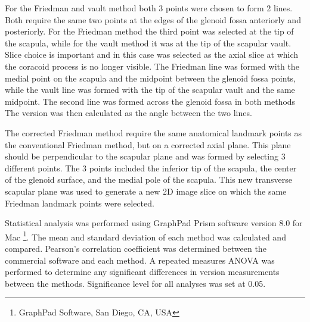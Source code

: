 For the Friedman and vault method both 3 points were chosen to form 2 lines. Both require the same two points at the edges of the glenoid fossa anteriorly and posteriorly. For the Friedman method the third point was selected at the tip of the scapula, while for the vault method it was at the tip of the scapular vault. Slice choice is important and in this case was selected as the axial slice at which the coracoid process is no longer visible. The Friedman line was formed with the medial point on the scapula and the midpoint between the glenoid fossa points, while the vault line was formed with the tip of the scapular vault and the same midpoint. The second line was formed across the glenoid fossa in both methods The version was then calculated as the angle between the two lines.

The corrected Friedman method require the same anatomical landmark points as the conventional Friedman method, but on a corrected axial plane. This plane should be perpendicular to the scapular plane and was formed by selecting 3 different points. The 3 points included the inferior tip of the scapula, the center of the glenoid surface, and the medial pole of the scapula. This new transverse scapular plane was used to generate a new 2D image slice on which the same Friedman landmark points were selected.


Statistical analysis was performed using GraphPad Prism software version 8.0 for
Mac \footnote{GraphPad Software, San Diego, CA, USA}. The mean and standard deviation of 
each method was calculated and compared. Pearson’s correlation coefficient was 
determined between the commercial software and each method. 
A repeated measures ANOVA was performed to determine any significant differences
in version measurements between the methods. Significance level for all analyses was set at 0.05.
